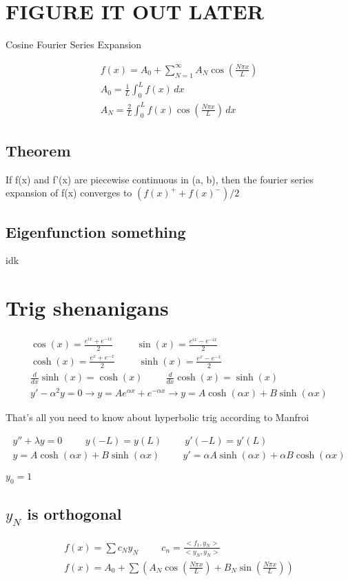 \documentclass[fleqn]{report}
\newcommand{\hp}{\hspace{1cm}}
\newcommand{\equations} [1] {
\begin{gather*}
#1
\end{gather*}
}
\begin{document}
\section{FIGURE IT OUT LATER}
Cosine Fourier Series Expansion
\equations{
f(x) = A_0 + \sum^\infty_{N = 1} A_N \cos ( \frac{N \pi x}{L})
\\
A_0 = \frac{1}{L} \int^L_0 f(x) \, dx
\\
A_N = \frac{2}{L} \int^L_0 f(x) \cos(\frac{N \pi x}{L}) \, dx
}

\subsection{Theorem}
If f(x) and f'(x) are piecewise continuous in (a, b), then the fourier series expansion of f(x) converges to 
$( f(x)^+ + f(x)^- ) / 2$
\subsection{Eigenfunction something}
idk


\section{Trig shenanigans}
\equations{
\cos(x) = \frac{e^{ix} + e^{-ix}}{2}
\hp
\sin(x) = \frac{e^{ix} - e^{-ix}}{2}
\\
\cosh(x) = \frac{e^{x} + e^{-x}}{2}
\hp
\sinh(x) = \frac{e^{x} - e^{-x}}{2}
\\
\frac{d}{dx} \sinh(x) = \cosh(x)
\hp
\frac{d}{dx} \cosh(x) = \sinh(x)
\\
y' - \alpha^2 y = 0 \rightarrow 
y = Ae^{\alpha x} + e^{-\alpha x} \rightarrow
y = A \cosh(\alpha x) + B \sinh(\alpha x)
}
That's all you need to know about hyperbolic trig according to Manfroi

\equations{
y'' + \lambda y = 0 \hp y(-L) = y(L) \hp y'(-L) = y'(L)
\\
y = A \cosh(\alpha x) + B \sinh(\alpha x)
\hp
y' = \alpha A \sinh(\alpha x) + \alpha B \cosh(\alpha x) 
}

$y_0 = 1$


\subsection{$y_N$ is orthogonal}
\equations{
f(x)  = \sum c_N y_N
\hp
c_n = \frac{<f_1, y_N>}{<y_N, y_N>}
\\
f(x) = A_0 + \sum(A_N \cos(\frac{N \pi x}{L}) + B_N \sin (\frac{N \pi x}{L}))
}
\end{document}
